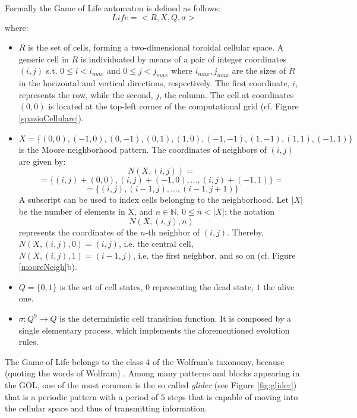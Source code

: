 Formally the Game of Life automaton is defined as follows:
$$Life = < R, X, Q, \sigma >$$ where:
\begin{itemize}
	\item $R$ is the set of cells, forming a two-dimensional toroidal cellular space. A generic
	cell in $R$ is individuated by means of a pair of integer
	coordinates $(i, j)$ s.t. $0 \leq i < i_{max}$ and $0 \leq j <
	j_{max}$ where $i_{max},j_{max}$ are the sizes of $R$ in the horizontal and vertical directions, respectively.
	The first coordinate, $i$, represents the row, while
	the second, $j$, the column. The cell at coordinates $(0,0)$ is
	located at the top-left corner of the computational grid
	(cf. Figure \ref{spazioCellulare}).
	
	\item $X = \{(0,0), (-1, 0), (0, -1), (0, 1), (1, 0), (-1,-1),
	(1,-1), (1,1), (-1,1)\}$ is the Moore neighborhood pattern. The
	coordinates of neighbors of $(i,j)$ are given by:
	$$N(X, (i, j)) = $$
	$$= \{(i, j)+(0,0), (i, j)+(-1, 0), \dots, (i, j)+(-1,1)\} =$$
	$$= \{(i, j), (i-1, j), \dots, (i-1,j+1)\}$$
	A subscript	can be used to index cells belonging to the
	neighborhood. Let $|X|$ be the number of elements in X, and $n
	\in \mathbb{N}$, $0 \leq n < |X|$; the notation
	$$N(X, (i, j), n)$$
	represents the coordinates of the $n$-th neighbor of  $(i,j)$.
	Thereby, $N(X, (i, j), 0) = (i, j)$, i.e. the
	central cell, $N(X, (i, j), 1) = (i-1, j)$, i.e. the first
	neighbor, and so on (cf. Figure \ref{mooreNeigh}b).
	
	\item $Q = \{0, 1\}$ is the set of cell states, $0$ representing the
	dead state, $1$ the alive one.
	
	\item $\sigma : Q^9 \rightarrow Q$ is the deterministic cell
	transition function. It is composed by a single elementary process,
	which implements the aforementioned evolution rules.
\end{itemize}
The Game of Life belongs to the class 4 of the Wolfram's taxonomy, because (quoting the words of Wolfram)
. 
Among many patterns and blocks appearing in the GOL, one of the most common is the so called \emph{glider} (see Figure \ref{fig:glider}) that is a periodic pattern with a period of $5$ steps that is capable of moving into the cellular space and thus of transmitting information.
